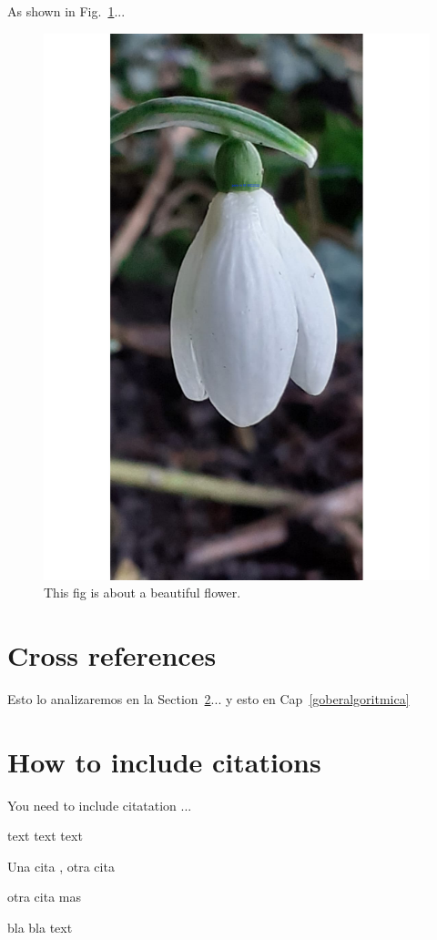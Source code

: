 \documentclass[12pt]{report} %
\begin{document}
As shown in Fig.~\ref{fig:sd}...

\begin{figure}
\centering
\includegraphics[width=0.45\columnwidth]{imagenes/SnowDrop30Dec2022.pdf}
\caption{This fig is about a beautiful flower.}
\label{fig:sd}
\end{figure}



\section{Cross references}
Esto lo analizaremos en la Section~\ref{howtocite}...
y esto en Cap~\ref{goberalgoritmica}

\section{How to include citations}
\label{howtocite}

You need to include citatation ...

 
text text text


Una cita \cite{LawCommission2021}, otra cita

 

\cite{LawCommission2020} otra cita mas

\cite{LawCommissionSummary2020}


bla bla text



\cite{Samer2017}

\cite{PrimaveraAaron2018}


\cite{Andersson2020}


\end{document}
